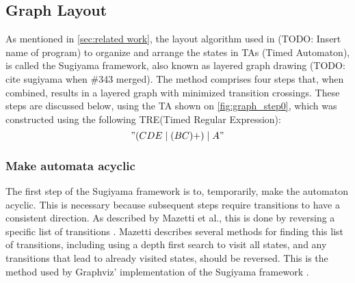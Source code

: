 \subsection{Graph Layout}\label{subsec:graphlayout}





As mentioned in \cref{sec:related work}, the layout algorithm used in (TODO: Insert name of program) to organize and arrange the states in TAs (Timed Automaton), is called the Sugiyama framework, also known as layered graph drawing (TODO: cite sugiyama when \#343 merged). The method comprises four steps that, when combined, results in a layered graph with minimized transition crossings. These steps are discussed below, using the TA shown on \cref{fig:graph_step0}, which was constructed using the following TRE(Timed Regular Expression): $$"(CDE\mid(BC)+)\mid A"$$



\subsubsection{Make automata acyclic}
The first step of the Sugiyama framework is to, temporarily, make the automaton acyclic. This is necessary because subsequent steps require transitions to have a consistent direction. As described by Mazetti et al., this is done by reversing a specific list of transitions \cite{Mazetti2012}.
Mazetti describes several methods for finding this list of transitions, including using a depth first search to visit all states, and any transitions that lead to already visited states, should be reversed.
This is the method used by Graphviz' implementation of the Sugiyama framework \cite{Graphviz}. %

